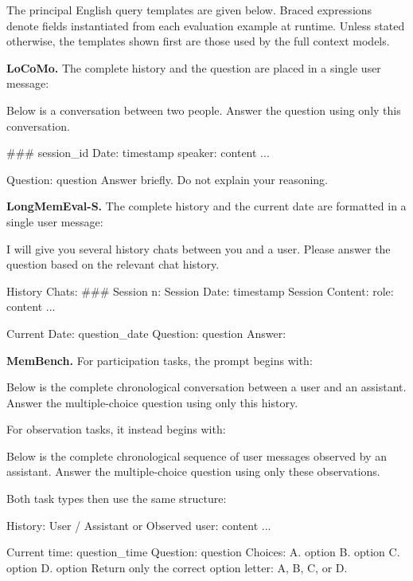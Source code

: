 The principal English query templates are given below. Braced expressions denote fields instantiated from each evaluation example at runtime.
Unless stated otherwise, the templates shown first are those used by the full context models.

\textbf{LoCoMo.}
The complete history and the question are placed in a single user message:

\begin{promptbox}
Below is a conversation between two people. Answer the question using only this conversation.

### {session_id}
Date: {timestamp}
{speaker}: {content}
...

Question: {question}
Answer briefly. Do not explain your reasoning.
\end{promptbox}

\textbf{LongMemEval-S.}
The complete history and the current date are formatted in a single user message:

\begin{promptbox}
I will give you several history chats between you and a user. Please answer the question based on the relevant chat history.

History Chats:
### Session {n}:
Session Date: {timestamp}
Session Content:
{role}: {content}
...

Current Date: {question_date}
Question: {question}
Answer:
\end{promptbox}

\textbf{MemBench.}
For participation tasks, the prompt begins with:

\begin{promptbox}
Below is the complete chronological conversation between a user and an assistant. Answer the multiple-choice question using only this history.
\end{promptbox}

For observation tasks, it instead begins with:

\begin{promptbox}
Below is the complete chronological sequence of user messages observed by an assistant. Answer the multiple-choice question using only these observations.
\end{promptbox}

Both task types then use the same structure:

\begin{promptbox}
History:
User / Assistant or Observed user: {content}
...

Current time: {question_time}
Question: {question}
Choices:
A. {option}
B. {option}
C. {option}
D. {option}
Return only the correct option letter: A, B, C, or D.
\end{promptbox}

